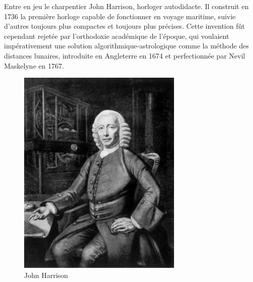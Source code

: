 Entre en jeu le charpentier John Harrison, horloger autodidacte. Il construit en 1736 la première horloge capable de fonctionner en voyage maritime, suivie d'autres toujours plus compactes et toujours plus précises. Cette invention fût cependant rejetée par l'orthodoxie académique de l'époque, qui voulaient impérativement une solution algorithmique-astrologique comme la méthode des distances lunaires, introduite en Angleterre en 1674 et perfectionnée par Nevil Maskelyne en 1767\cite{history-longitude}.

\begin{minipage}[H]{0.49\linewidth}
  \begin{figure}[H]
  \centering
  \includegraphics[height=0.15\paperheight]{../resources/illustrations/jharrison}
  \caption{John Harrison}
  \end{figure}
\end{minipage}
